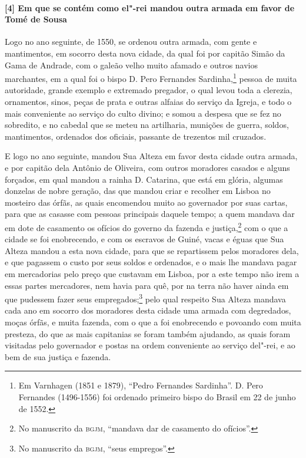 \begin{linenumbers}
\paragraph{[4] Em que se contém como el"-rei mandou outra armada em favor de Tomé de Sousa} \quad
Logo no ano seguinte, de 1550, se ordenou outra armada, com gente e mantimentos, em
socorro desta nova cidade, da qual foi por capitão Simão da Gama de Andrade, com o galeão
velho muito afamado e outros navios marchantes, em a qual foi o bispo D. Pero Fernandes
Sardinha,\footnote{ Em Varnhagen (1851 e 1879), ``Pedro Fernandes Sardinha''. D. Pero
Fernandes (1496-1556) foi ordenado primeiro bispo do Brasil em 22 de junho de 1552.}
pessoa de muita autoridade, grande exemplo e extremado pregador, o qual levou toda a
clerezia, ornamentos, sinos, peças de prata e outras alfaias do serviço da Igreja, e todo
o mais conveniente ao serviço do culto divino; e somou a despesa que se fez no sobredito,
e no cabedal que se meteu na artilharia, munições de guerra, soldos, mantimentos,
ordenados dos oficiais, passante de trezentos mil cruzados.

E logo no ano seguinte, mandou Sua Alteza em favor desta cidade outra armada, e por
capitão dela Antônio de Oliveira, com outros moradores casados e alguns forçados, em qual
mandou a rainha D. Catarina, que está em glória, algumas donzelas de nobre geração, das
que mandou criar e recolher em Lisboa no mosteiro das órfãs, as quais encomendou muito ao
governador por suas cartas, para que as casasse com pessoas principais daquele tempo; a
quem mandava dar em dote de casamento os ofícios do governo da fazenda e
justiça,\footnote{ No manuscrito da \textsc{bgjm}, ``mandava dar de casamento do
ofícios''.} com o que a cidade se foi enobrecendo, e com os escravos de Guiné, vacas e
éguas que Sua Alteza mandou a esta nova cidade, para que se repartissem pelos moradores
dela, e que pagassem o custo por seus soldos e ordenados, e o mais lhe mandava pagar em
mercadorias pelo preço que custavam em Lisboa, por a este tempo não irem a essas partes
mercadores, nem havia para quê, por na terra não haver ainda em que pudessem fazer seus
empregados;\footnote{ No manuscrito da \textsc{bgjm}, ``seus empregos''.} pelo qual
respeito Sua Alteza mandava cada ano em socorro dos moradores desta cidade uma armada com
degredados, moças órfãs, e muita fazenda, com o que a foi enobrecendo e povoando com muita
presteza, do que as mais capitanias se foram também ajudando, as quais foram visitadas
pelo governador e postas na ordem conveniente ao serviço del"-rei, e ao bem de sua justiça
e fazenda.


\end{linenumbers}
